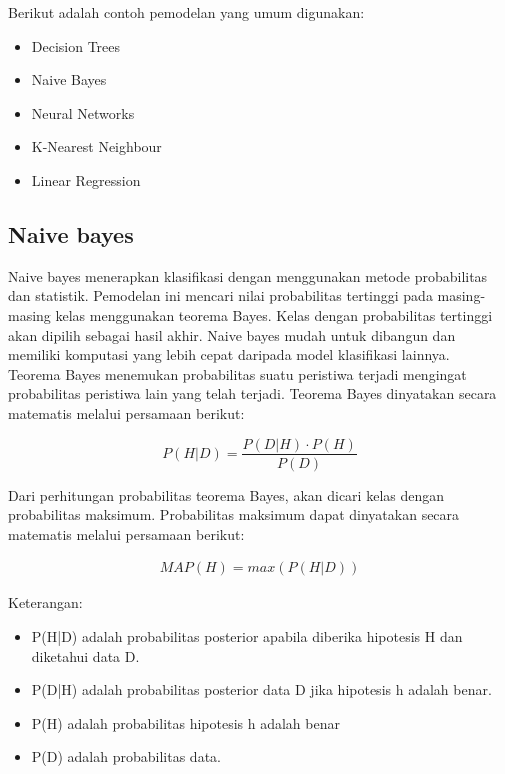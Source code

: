\noindent Berikut adalah contoh pemodelan yang umum digunakan:
\begin{itemize}
\item Decision Trees
\item Naive Bayes
\item Neural Networks
\item K-Nearest Neighbour
\item Linear Regression
\end{itemize}

\newpage
\subsection{Naive bayes}
\par Naive bayes menerapkan klasifikasi dengan menggunakan metode probabilitas dan statistik. Pemodelan ini mencari nilai probabilitas tertinggi pada masing-masing kelas menggunakan teorema Bayes. Kelas dengan probabilitas tertinggi akan dipilih sebagai hasil akhir. Naive bayes mudah untuk dibangun dan memiliki komputasi yang lebih cepat daripada model klasifikasi lainnya.\\

\noindent Teorema Bayes menemukan probabilitas suatu peristiwa terjadi mengingat probabilitas peristiwa lain yang telah terjadi. Teorema Bayes dinyatakan secara matematis melalui persamaan berikut:

\begin{equation}
P(H|D) = \frac{P(D|H) \cdot P(H)}{P(D)}
\end{equation}

\noindent
Dari perhitungan probabilitas teorema Bayes, akan dicari kelas dengan probabilitas maksimum. Probabilitas maksimum dapat dinyatakan secara matematis melalui persamaan berikut:

\begin{align}
MAP(H) = max(P(H|D))
\end{align}

\noindent Keterangan:
\begin{itemize}
\item P(H|D) adalah probabilitas posterior apabila diberika hipotesis H dan diketahui data D. 
\item P(D|H) adalah probabilitas posterior data D jika hipotesis h adalah benar.
\item P(H) adalah probabilitas hipotesis h adalah benar 
\item P(D) adalah probabilitas data.
\end{itemize}

